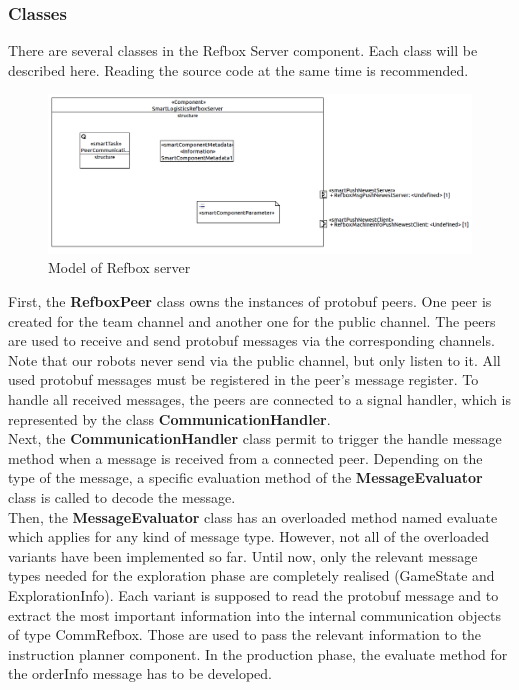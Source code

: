 \subsubsection{Classes}

There are several classes in the Refbox Server component. Each class will be described here. Reading the source code at the same time is recommended.\\

\begin{figure}[!h]
\centering
\includegraphics[width=\linewidth]{pic/component_refbox_server.png}
\caption{Model of Refbox server}
\label{fig:modelRefboxServer}
\end{figure}

First, the \textbf{RefboxPeer} class owns the instances of protobuf peers. One peer is created for the team channel and another one for the public channel. The peers are used to receive and send protobuf messages via the corresponding channels. Note that our robots never send via the public channel, but only listen to it. All used protobuf messages must be registered in the peer’s message register. To handle all received messages, the peers are connected to a signal handler, which is represented by the class \textbf{CommunicationHandler}. \\

Next, the \textbf{CommunicationHandler} class permit to trigger the handle message method when a message is received from a connected peer. Depending on the type of the message, a specific evaluation method of the \textbf{MessageEvaluator} class is called to decode the message.\\

Then, the \textbf{MessageEvaluator} class has an overloaded method named evaluate which applies for any kind of message type. However, not all of the overloaded variants have been implemented so far. Until now, only the relevant message types needed for the exploration phase are completely realised (GameState and ExplorationInfo). Each variant is supposed to read the protobuf message and to extract the most important information into the internal communication objects of type CommRefbox. Those are used to pass the relevant information to the instruction planner component. In the production phase, the evaluate method for the orderInfo message has to be developed.\\


